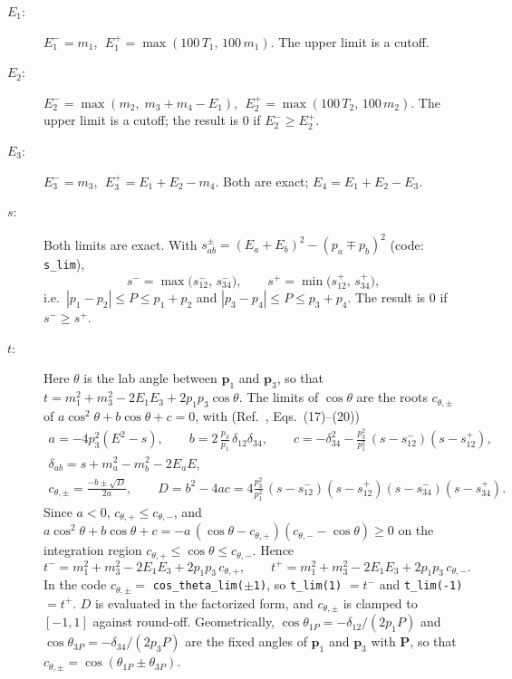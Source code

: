\documentclass[11pt,a4paper]{article}
\newcommand{\code}[1]{\texttt{#1}}
\begin{document}
\begin{description}
\item[$E_1$:] $E_1^- = m_1$, $\;E_1^+ = \max(100\,T_1,\,100\,m_1)$.
  The upper limit is a cutoff.
\item[$E_2$:] $E_2^- = \max(m_2,\; m_3+m_4-E_1)$,
  $\;E_2^+ = \max(100\,T_2,\,100\,m_2)$. The upper limit is a cutoff; the
  result is $0$ if $E_2^-\ge E_2^+$.
\item[$E_3$:] $E_3^- = m_3$, $\;E_3^+ = E_1+E_2-m_4$. Both are exact;
  $E_4 = E_1+E_2-E_3$.
\item[$s$:] Both limits are exact. With
  $s_{ab}^{\pm} = (E_a+E_b)^2-(p_a\mp p_b)^2$ (code: \code{s\_lim}),
  \begin{equation}
    s^- = \max\big(s_{12}^-,\,s_{34}^-\big),\qquad
    s^+ = \min\big(s_{12}^+,\,s_{34}^+\big),
  \end{equation}
  i.e.\ $|p_1-p_2|\le P\le p_1+p_2$ and $|p_3-p_4|\le P\le p_3+p_4$. The
  result is $0$ if $s^-\ge s^+$.
\item[$t$:] Here $\theta$ is the lab angle between $\mathbf{p}_1$ and
  $\mathbf{p}_3$, so that $t = m_1^2+m_3^2-2E_1E_3+2p_1p_3\cos\theta$. The
  limits of $\cos\theta$ are the roots $c_{\theta,\pm}$ of
  $a\cos^2\theta+b\cos\theta+c=0$, with (Ref.~\cite{Bringmann:2022aim},
  Eqs.~(17)--(20))
  \begin{gather}
    a = -4p_3^2(E^2-s),\qquad
    b = 2\,\frac{p_3}{p_1}\,\delta_{12}\delta_{34},\qquad
    c = -\delta_{34}^2-\frac{p_3^2}{p_1^2}\,(s-s_{12}^-)(s-s_{12}^+),\\
    \delta_{ab} = s+m_a^2-m_b^2-2E_aE,\\
    c_{\theta,\pm} = \frac{-b\pm\sqrt{D}}{2a},\qquad
    D = b^2-4ac
    = 4\frac{p_3^2}{p_1^2}\,(s-s_{12}^-)(s-s_{12}^+)(s-s_{34}^-)(s-s_{34}^+).
  \end{gather}
  Since $a<0$, $c_{\theta,+}\le c_{\theta,-}$, and
  $a\cos^2\theta+b\cos\theta+c = -a\,(\cos\theta-c_{\theta,+})(c_{\theta,-}-\cos\theta)\ge0$
  on the integration region $c_{\theta,+}\le\cos\theta\le c_{\theta,-}$. Hence
  \begin{equation}
    t^- = m_1^2+m_3^2-2E_1E_3+2p_1p_3\,c_{\theta,+},\qquad
    t^+ = m_1^2+m_3^2-2E_1E_3+2p_1p_3\,c_{\theta,-}.
  \end{equation}
  In the code $c_{\theta,\pm}=$ \code{cos\_theta\_lim($\pm$1)}, so
  \code{t\_lim(1)} $=t^-$ and \code{t\_lim(-1)} $=t^+$. $D$ is evaluated in
  the factorized form, and $c_{\theta,\pm}$ is clamped to $[-1,1]$ against
  round-off. Geometrically, $\cos\theta_{1P}=-\delta_{12}/(2p_1P)$ and
  $\cos\theta_{3P}=-\delta_{34}/(2p_3P)$ are the fixed angles of
  $\mathbf{p}_1$ and $\mathbf{p}_3$ with $\mathbf{P}$, so that
  $c_{\theta,\pm}=\cos(\theta_{1P}\pm\theta_{3P})$.
\end{description}
\end{document}
